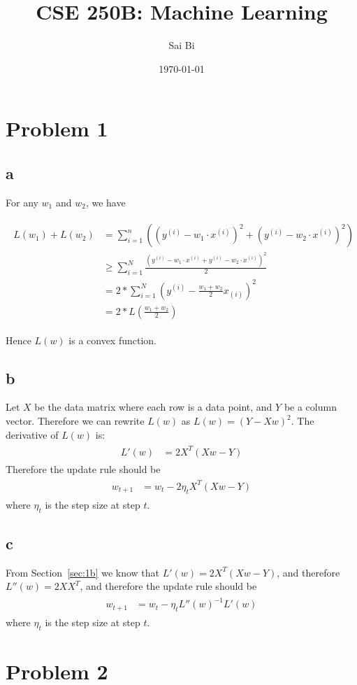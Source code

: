 \documentclass[a4paper,11pt]{article}
\theoremstyle{mytheor}
\newcommand{\myequ}[1]{\begin{align}\begin{split} #1 \end{split}\end{align}}
\begin{document}
\title{CSE 250B: Machine Learning}

\author{Sai Bi}

\date{\today}

\maketitle

\section*{Problem 1}
\subsection*{a}
For any $w_1$ and $w_2$, we have

\begin{align}
	\begin{split}
		L(w_1) + L(w_2) &= \sum_{i=1}^{n} ((y^{(i)} - w_1 \cdot x^{(i)})^2 + (y^{(i)} - w_2 \cdot x^{(i)})^2) \\
						& \geq  \sum_{i=1}^{N}\frac{(y^{(i)} -  w_1 \cdot x^{(i)} + y^{(i)} -  w_2 \cdot x^{(i)} )^2 }{2} \\
					& = 2 * \sum_{i=1}^{N} (y^{(i)} - \frac{w_1 + w_2}{2} x_{(i)})^2 \\
					& = 2 * L(\frac{w_1+w_2}{2})
	\end{split}
\end{align}

Hence $L(w)$ is a convex function.

\subsection*{b}\label{sec:1b}
Let $X$  be the data matrix where each row is a data point, and $Y$ be a column vector. Therefore we can rewrite $L(w)$
as $L(w) = (Y - Xw)^2$. The derivative of $L(w)$ is:
\myequ{
	L'(w) &= 2X^T(Xw-Y) 
}
Therefore the update rule should be 
\myequ{
	w_{t+1} &= w_t - 2\eta_{t} X^T (Xw-Y) 
}
where $\eta_{t}$ is the step size at step $t$.
\subsection*{c}
From Section~\ref{sec:1b} we know that $L'(w) = 2X^T(Xw-Y) $, and therefore $L''(w) = 2XX^T$, and therefore the update
rule should be
\myequ{
	w_{t+1} &= w_t - \eta_{t} L''(w)^{-1} L'(w)
}
where $\eta_{t}$ is the step size at step $t$.


\section*{Problem 2}
\end{document}
